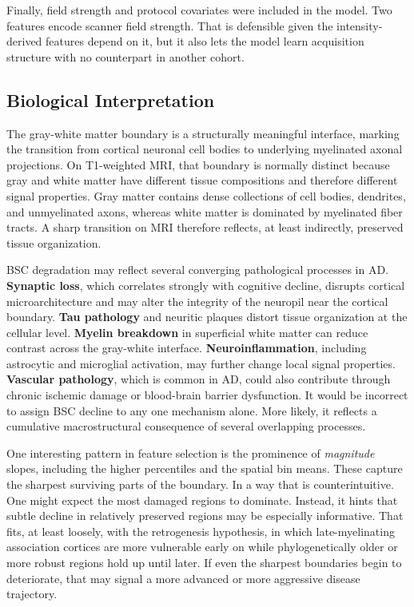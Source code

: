 \documentclass[blue]{ludusofficial}  %
\begin{document}
Finally, field strength and protocol covariates were included in the model. Two features encode scanner field strength. That is defensible given the intensity-derived features depend on it, but it also lets the model learn acquisition structure with no counterpart in another cohort.

\subsection{Biological Interpretation}

The gray-white matter boundary is a structurally meaningful interface, marking the transition from cortical neuronal cell bodies to underlying myelinated axonal projections. On T1-weighted MRI, that boundary is normally distinct because gray and white matter have different tissue compositions and therefore different signal properties. Gray matter contains dense collections of cell bodies, dendrites, and unmyelinated axons, whereas white matter is dominated by myelinated fiber tracts. A sharp transition on MRI therefore reflects, at least indirectly, preserved tissue organization.

BSC degradation may reflect several converging pathological processes in AD. \textbf{Synaptic loss}, which correlates strongly with cognitive decline, disrupts cortical microarchitecture and may alter the integrity of the neuropil near the cortical boundary. \textbf{Tau pathology} and neuritic plaques distort tissue organization at the cellular level. \textbf{Myelin breakdown} in superficial white matter can reduce contrast across the gray-white interface. \textbf{Neuroinflammation}, including astrocytic and microglial activation, may further change local signal properties. \textbf{Vascular pathology}, which is common in AD, could also contribute through chronic ischemic damage or blood-brain barrier dysfunction. It would be incorrect to assign BSC decline to any one mechanism alone. More likely, it reflects a cumulative macrostructural consequence of several overlapping processes.

One interesting pattern in feature selection is the prominence of \textit{magnitude} slopes, including the higher percentiles and the spatial bin means. These capture the sharpest surviving parts of the boundary. In a way that is counterintuitive. One might expect the most damaged regions to dominate. Instead, it hints that subtle decline in relatively preserved regions may be especially informative. That fits, at least loosely, with the retrogenesis hypothesis, in which late-myelinating association cortices are more vulnerable early on while phylogenetically older or more robust regions hold up until later. If even the sharpest boundaries begin to deteriorate, that may signal a more advanced or more aggressive disease trajectory.
\end{document}
